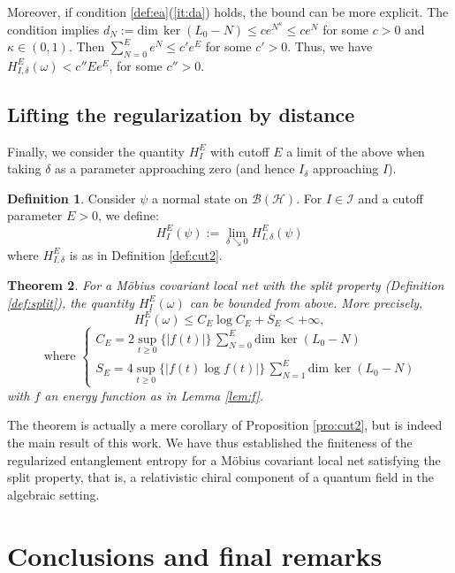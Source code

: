 \documentclass[a4paper,12pt]{article}
\theoremstyle{plain}
\newtheorem{theo}{Theorem}[section]
\theoremstyle{definition}
\newtheorem{defi}[theo]{Definition}
\theoremstyle{remark}
\def\B{{\mathcal B}}
\def\H{{\mathcal H}}
\def\dim{\mathrm{dim}\,}
\begin{document}
Moreover, if condition \ref{def:ea}(\ref{it:da}) holds,
the bound can be more explicit.
The condition implies $d_N := \dim\ker(L_0-N) \le ce^{N^\kappa} \le ce^{N}$ for some $c>0$ and $\kappa\in(0,1)$.
Then $\sum_{N=0}^E e^{N} \le c' e^E$ for some $c'>0$. Thus, we have $H_{I,\delta}^E(\omega) < c'' E e^E$, for some $c''>0$.

\subsection{Lifting the regularization by distance}
Finally, we consider the quantity $H_I^E$ with cutoff $E$ a limit of the above when taking $\delta$ as a parameter approaching zero
(and hence $I_\delta$ approaching $I$).

\begin{defi}\label{def:cut3} Consider $\psi$ a normal state on $\B(\H)$.
For $I\in\mathcal{I}$ and a cutoff parameter $E>0$, we define:
 \[
  H_{I}^E(\psi) := \lim_{\delta\searrow 0}H_{I,\delta}^E(\psi)
 \]
where $H_{I,\delta}^E$ is as in Definition \ref{def:cut2}.
\end{defi}

\begin{theo}\label{thm:cut3} For a M\"obius covariant local net with the split property (Definition \ref{def:split}),
the quantity $H_I^E(\omega)$ can be bounded from above. More precisely,
\[ H_{I}^E(\omega) \le C_E\log C_E + S_E < +\infty, \]
\[ \text{ where } \left\{ 
  \begin{array}{l}{\displaystyle
    C_E = 2 \sup_{t \ge 0}\{ |f(t)| \} \,\sum_{N=0}^E \dim \ker (L_0 -N) }\\
    {\displaystyle S_E = 4 \sup_{t \ge 0}\{ |f(t)\log f(t)| \} \, \sum_{N=1}^E \dim\ker(L_0-N)}
  \end{array} \right. \]
with $f$ an energy function as in Lemma \ref{lem:f}.\end{theo}

The theorem is actually a mere corollary of Proposition \ref{pro:cut2}, but is indeed the main result of this work.
We have thus established the finiteness of the regularized entanglement entropy for a Möbius covariant local net satisfying the split property, that is, a relativistic chiral component of a quantum field in the algebraic setting.

\section{Conclusions and final remarks}\label{sec:conclusions}
\end{document}
